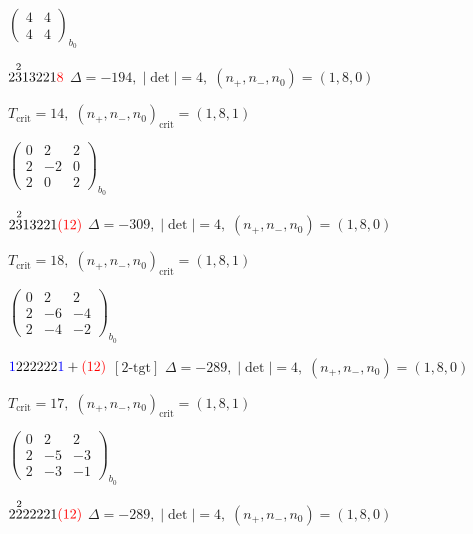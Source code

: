 \documentclass[10pt]{article}
\begin{document}
\hspace{2em}$\left(\begin{smallmatrix}4 & 4 \\ 4 & 4\end{smallmatrix}\right)_{\!b_0}$

\smallskip

$2\overset{2}{3}13221\textcolor{red}{8}$ \quad $\Delta=-194,\; |\det|=4,\; (n_+,n_-,n_0)=(1,8,0)$

\hspace{1em}$T_{\text{crit}}=14,\; (n_+,n_-,n_0)_{\text{crit}}=(1,8,1)$

\hspace{2em}$\left(\begin{smallmatrix}0 & 2 & 2 \\ 2 & -2 & 0 \\ 2 & 0 & 2\end{smallmatrix}\right)_{\!b_0}$

$2\overset{2}{3}13221\textcolor{red}{(12)}$ \quad $\Delta=-309,\; |\det|=4,\; (n_+,n_-,n_0)=(1,8,0)$

\hspace{1em}$T_{\text{crit}}=18,\; (n_+,n_-,n_0)_{\text{crit}}=(1,8,1)$

\hspace{2em}$\left(\begin{smallmatrix}0 & 2 & 2 \\ 2 & -6 & -4 \\ 2 & -4 & -2\end{smallmatrix}\right)_{\!b_0}$

\smallskip

$\textcolor{blue}{1}222222\textcolor{blue}{1}+\textcolor{red}{(12)}$ $\scriptstyle [2\text{-tgt}]$ \quad $\Delta=-289,\; |\det|=4,\; (n_+,n_-,n_0)=(1,8,0)$

\hspace{1em}$T_{\text{crit}}=17,\; (n_+,n_-,n_0)_{\text{crit}}=(1,8,1)$

\hspace{2em}$\left(\begin{smallmatrix}0 & 2 & 2 \\ 2 & -5 & -3 \\ 2 & -3 & -1\end{smallmatrix}\right)_{\!b_0}$

\smallskip

$2\overset{2}{2}22221\textcolor{red}{(12)}$ \quad $\Delta=-289,\; |\det|=4,\; (n_+,n_-,n_0)=(1,8,0)$
\end{document}
